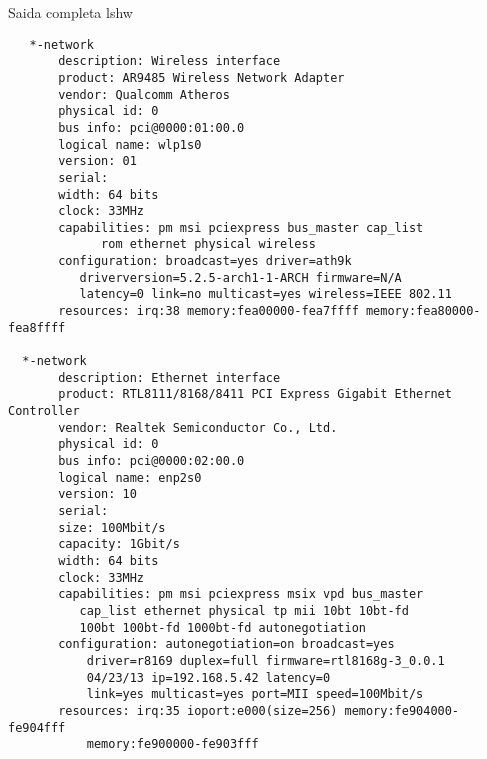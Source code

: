 \documentclass[11pt]{article}
\begin{document}
   \newpage
      Saida completa lshw\\
      \begin{tiny}
         \begin{verbatim}
   *-network
       description: Wireless interface
       product: AR9485 Wireless Network Adapter
       vendor: Qualcomm Atheros
       physical id: 0
       bus info: pci@0000:01:00.0
       logical name: wlp1s0
       version: 01
       serial: 
       width: 64 bits
       clock: 33MHz
       capabilities: pm msi pciexpress bus_master cap_list
             rom ethernet physical wireless
       configuration: broadcast=yes driver=ath9k
          driverversion=5.2.5-arch1-1-ARCH firmware=N/A
          latency=0 link=no multicast=yes wireless=IEEE 802.11
       resources: irq:38 memory:fea00000-fea7ffff memory:fea80000-fea8ffff

  *-network
       description: Ethernet interface
       product: RTL8111/8168/8411 PCI Express Gigabit Ethernet Controller
       vendor: Realtek Semiconductor Co., Ltd.
       physical id: 0
       bus info: pci@0000:02:00.0
       logical name: enp2s0
       version: 10
       serial: 
       size: 100Mbit/s
       capacity: 1Gbit/s
       width: 64 bits
       clock: 33MHz
       capabilities: pm msi pciexpress msix vpd bus_master
          cap_list ethernet physical tp mii 10bt 10bt-fd
          100bt 100bt-fd 1000bt-fd autonegotiation
       configuration: autonegotiation=on broadcast=yes
           driver=r8169 duplex=full firmware=rtl8168g-3_0.0.1
           04/23/13 ip=192.168.5.42 latency=0
           link=yes multicast=yes port=MII speed=100Mbit/s
       resources: irq:35 ioport:e000(size=256) memory:fe904000-fe904fff
           memory:fe900000-fe903fff
      \end{verbatim}
   \end{tiny}
 
\end{document}
